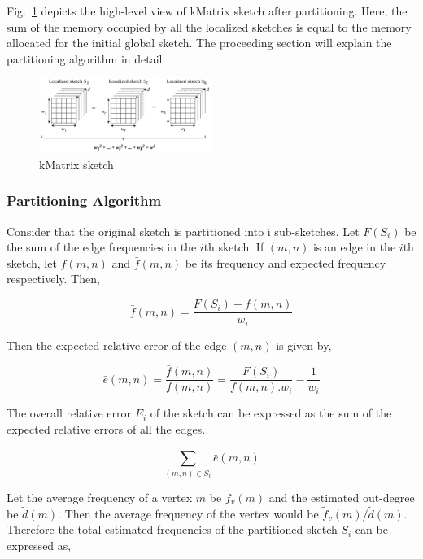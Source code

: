 Fig.~\ref{fig:kmatrix} depicts the high-level view of kMatrix sketch after partitioning. Here, the sum of the memory occupied by all the localized sketches is equal to the memory allocated for the initial global sketch. The proceeding section will explain the partitioning algorithm in detail. 

\begin{figure}[htbp]
    \centerline{\includegraphics[width=0.5\textwidth]{img/kmatrix.png}}
    \caption{kMatrix sketch}
    \label{fig:kmatrix}
\end{figure}

\subsubsection*{Partitioning Algorithm}

Consider that the original sketch is partitioned into i sub-sketches. Let \(F(S_i)\) be the sum of the edge frequencies in the \(i\)th sketch. If \((m,n)\) is an edge in the \(i\)th sketch, let \(f(m,n)\) and \(\bar{f}(m,n)\) be its frequency and expected frequency respectively. Then,

\begin{equation}
    \bar{f}(m,n) = \frac{F(S_i) - f(m,n)}{w_i}
    \label{eq:1}
\end{equation}

Then the expected relative error of the edge \((m,n)\) is given by,

\begin{equation}
    \bar{e}(m,n) = \frac{\bar{f}(m,n)}{f(m,n)} = \frac{F(S_i)}{f(m,n) . w_i} - \frac{1}{w_i}
    \label{eq:2}
\end{equation}

The overall relative error \(E_i\) of the sketch can be expressed as the sum of the expected relative errors of all the edges.

\begin{equation}
    \sum_{(m,n) \in S_i}^{} \bar{e}(m,n)
    \label{eq:3}
\end{equation}

Let the average frequency of a vertex \(m\) be \(\tilde{f}_v(m)\) and the estimated out-degree be \(\tilde{d}(m)\). Then the average frequency of the vertex would be \( \tilde{f}_v(m) / \tilde{d}(m) \). Therefore the total estimated frequencies of the partitioned sketch \(S_i\) can be expressed as,

